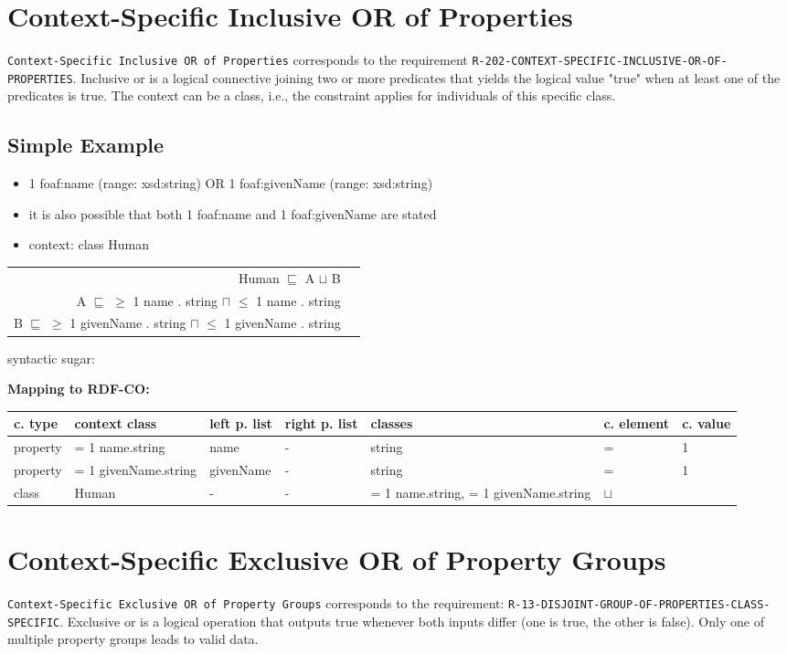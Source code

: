 \documentclass{llncs}
\newcommand{\ms}[1]{\texttt{#1}}
\newenvironment{gcotable}{
  \scriptsize
  \sffamily
  \vspace{0cm}
	\begin{center}
	\textbf{\vspace{0.4cm}Mapping to RDF-CO:} \\
  \begin{tabular}{l|l|l|l|l|l|l}
	\hline
  \textbf{c. type} & \textbf{context class} & \textbf{left p. list} & \textbf{right p. list} & \textbf{classes} & \textbf{c. element} & \textbf{c. value} \\
  \hline

}{
  \hline
  \end{tabular}
	\end{center}
}
\newenvironment{DL}{
  \vspace{0cm}
	\begin{center}
  \begin{tabular}{r l}

}{
  \end{tabular}
	\end{center}
}
\begin{document}
\section{Context-Specific Inclusive OR of Properties}

\ms{Context-Specific Inclusive OR of Properties} corresponds to the requirement
\ms{R-202-CONTEXT-SPECIFIC-INCLUSIVE-OR-OF-PROPERTIES}.
Inclusive or is a logical connective joining two or more predicates that yields the logical value "true" when at least one of the predicates is true.
The context can be a class, i.e., the constraint applies for individuals of this specific class.

\subsection{Simple Example}

\begin{itemize}
	\item 1 foaf:name (range: xsd:string) OR 1 foaf:givenName (range: xsd:string)
	\item it is also possible that both 1 foaf:name and 1 foaf:givenName are stated
	\item context: class Human
\end{itemize}

\begin{DL}
Human $\sqsubseteq$ A $\sqcup$ B \\
A $\sqsubseteq$ $\geq$ 1 name . string $\sqcap$ $\leq$ 1 name . string \\
B $\sqsubseteq$ $\geq$ 1 givenName . string $\sqcap$ $\leq$ 1 givenName . string \\
\end{DL}

syntactic sugar:
\begin{gcotable}
property & = 1 name.string & name & - & string & = & 1 \\
property & = 1 givenName.string & givenName & - & string & = & 1 \\
class & Human & - & - & = 1 name.string, = 1 givenName.string & $\sqcup$ \\
\end{gcotable}

\section{Context-Specific Exclusive OR of Property Groups}

\ms{Context-Specific Exclusive OR of Property Groups} corresponds to the requirement:
\ms{R-13-DISJOINT-GROUP-OF-PROPERTIES-CLASS-SPECIFIC}.
Exclusive or is a logical operation that outputs true whenever both inputs differ (one is true, the other is false).
Only one of multiple property groups leads to valid data.
\end{document}
